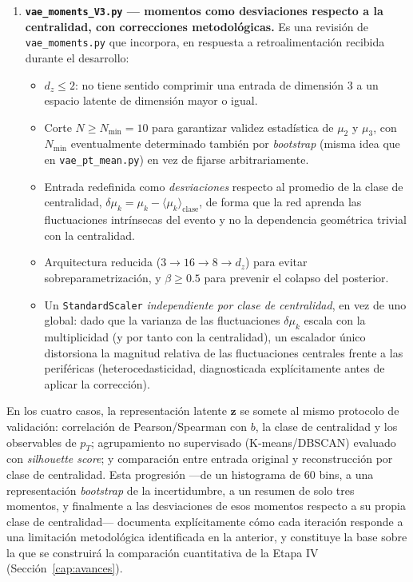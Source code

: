 \begin{enumerate}
\item \textbf{\texttt{vae\_moments\_V3.py} — momentos como desviaciones
respecto a la centralidad, con correcciones metodológicas.} Es una
revisión de \texttt{vae\_moments.py} que incorpora, en respuesta a
retroalimentación recibida durante el desarrollo:
\begin{itemize}
    \item $d_z\le 2$: no tiene sentido comprimir una entrada de dimensión 3
    a un espacio latente de dimensión mayor o igual.
    \item Corte $N\ge N_{\min}=10$ para garantizar validez estadística de
    $\mu_2$ y $\mu_3$, con $N_{\min}$ eventualmente determinado también por
    \textit{bootstrap} (misma idea que en \texttt{vae\_pt\_mean.py}) en
    vez de fijarse arbitrariamente.
    \item Entrada redefinida como \emph{desviaciones} respecto al promedio
    de la clase de centralidad, $\delta\mu_k=\mu_k-\langle\mu_k\rangle_{\text{clase}}$,
    de forma que la red aprenda las fluctuaciones intrínsecas del evento y
    no la dependencia geométrica trivial con la centralidad.
    \item Arquitectura reducida ($3\to16\to8\to d_z$) para evitar
    sobreparametrización, y $\beta\ge0.5$ para prevenir el colapso del
    posterior.
    \item Un \texttt{StandardScaler} \emph{independiente por clase de
    centralidad}, en vez de uno global: dado que la varianza de las
    fluctuaciones $\delta\mu_k$ escala con la multiplicidad (y por tanto con
    la centralidad), un escalador único distorsiona la magnitud relativa
    de las fluctuaciones centrales frente a las periféricas
    (heterocedasticidad, diagnosticada explícitamente antes de aplicar la
    corrección).
\end{itemize}

\end{enumerate}

\noindent
En los cuatro casos, la representación latente $\mathbf{z}$ se somete al
mismo protocolo de validación: correlación de Pearson/Spearman con $b$, la
clase de centralidad y los observables de $p_T$; agrupamiento no
supervisado (K-means/DBSCAN) evaluado con \textit{silhouette score}; y
comparación entre entrada original y reconstrucción por clase de
centralidad. Esta progresión —de un histograma de 60 bins, a una
representación \textit{bootstrap} de la incertidumbre, a un resumen de solo
tres momentos, y finalmente a las desviaciones de esos momentos respecto a
su propia clase de centralidad— documenta explícitamente cómo cada
iteración responde a una limitación metodológica identificada en la
anterior, y constituye la base sobre la que se construirá la comparación
cuantitativa de la Etapa IV (Sección~\ref{cap:avances}).

